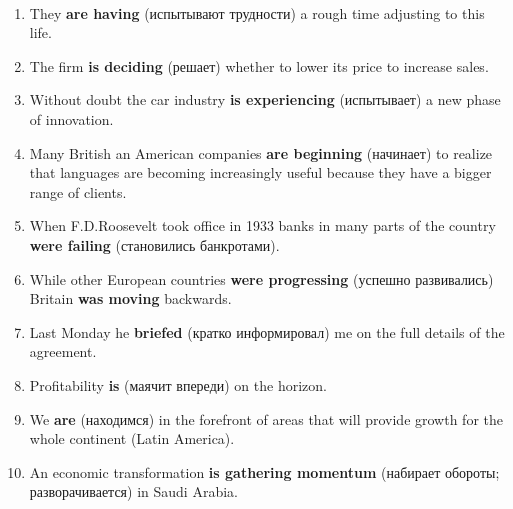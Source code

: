 \documentclass[main.tex]{subfiles}
\begin{document}
\ 


\begin{enumerate}[nosep,leftmargin=*]
	\item They \textbf{are having} (испытывают трудности) a rough time adjusting to this life.
	\item The firm \textbf{is deciding} (решает) whether to lower its price to increase sales.
	\item Without doubt the car industry \textbf{is experiencing} (испытывает) a new phase of innovation.
	\item Many British an American companies \textbf{are beginning} (начинает) to realize that languages are becoming increasingly useful because they have a bigger range of clients.
	\item When F.D.Roosevelt took office in 1933 banks in many parts of the country \textbf{were failing} (становились банкротами).
	\item While other European countries \textbf{were progressing} (успешно развивались) Britain \textbf{was moving} backwards.
	\item Last Monday he \textbf{briefed} (кратко информировал) me on the full details of the agreement.
	\item Profitability \textbf{is} (маячит впереди) on the horizon.
	\item We \textbf{are} (находимся) in the forefront of areas that will provide growth for the whole continent (Latin America).
	\item An economic transformation \textbf{is gathering momentum} (набирает обороты; разворачивается) in Saudi Arabia.
\end{enumerate}
\ 

\end{document}
